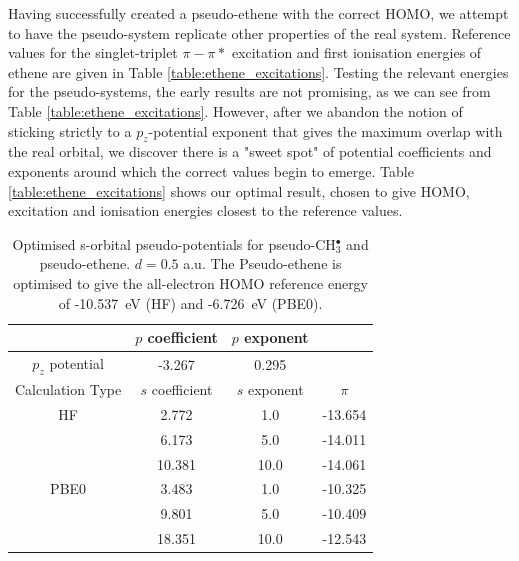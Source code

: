 \documentclass[journal=jctcce,manuscript=article]{achemso}
\begin{document}
Having successfully created a pseudo-ethene with the correct HOMO, we attempt to have the pseudo-system replicate other properties of the real system. Reference values for the singlet-triplet \(\pi-\pi*\) excitation and first ionisation energies of ethene are given in Table \ref{table:ethene_excitations}. Testing the relevant energies for the pseudo-systems, the early results are not promising, as we can see from Table \ref{table:ethene_excitations}. However, after we abandon the notion of sticking strictly to a \(p_{z}\)-potential exponent that gives the maximum overlap with the real orbital, we discover there is a "sweet spot" of potential coefficients and exponents around which the correct values begin to emerge. Table \ref{table:ethene_excitations} shows our optimal result, chosen to give HOMO, excitation and ionisation energies closest to the reference values. 

\begin{table}[ht]
\caption{Optimised s-orbital pseudo-potentials for pseudo-CH\(^{\bullet}_{3}\) and pseudo-ethene. \(d = 0.5\) a.u. The Pseudo-ethene is optimised to give the all-electron HOMO reference energy of  -10.537~eV (HF) and -6.726~eV (PBE0).}
\begin{tabular}{c c c c}
\hline
& \(p\) coefficient & \(p\) exponent \\
\hline
\(p_{z}\) potential & -3.267 & 0.295 \\
\hline
Calculation Type & \(s\) coefficient & \(s\) exponent & \(\pi\) \\
\hline\hline
HF & 2.772 & 1.0 & -13.654 \\
 & 6.173 & 5.0 & -14.011 \\
 & 10.381 & 10.0 & -14.061 \\
\hline
PBE0 & 3.483 & 1.0 & -10.325 \\
 & 9.801 & 5.0 & -10.409 \\
 & 18.351 & 10.0 & -12.543 \\
\hline
\end{tabular}
\label{table:p_potentials}
\end{table}
\end{document}
